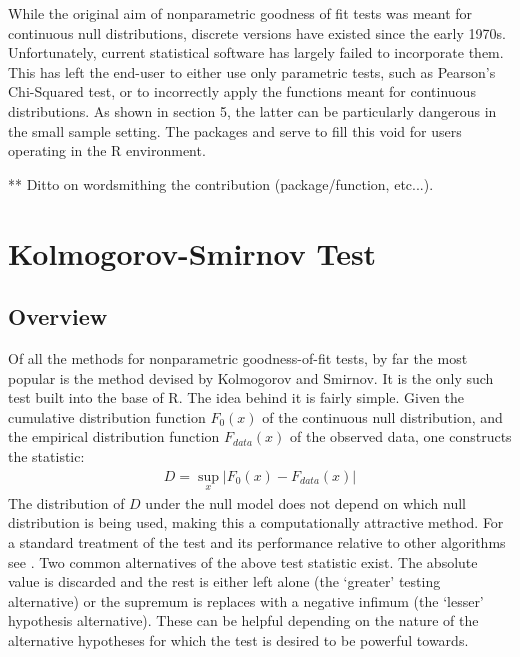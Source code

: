 While the original aim of nonparametric goodness of fit tests was meant for continuous null distributions, discrete versions
have existed since the early 1970s. Unfortunately, current statistical software has largely failed to incorporate them.
This has left the end-user to either use only parametric tests, such as Pearson's Chi-Squared test, or to incorrectly
apply the functions meant for continuous distributions. As shown in section 5, the latter can be particularly dangerous
in the small sample setting. The packages  and  serve to fill this void for users
operating in the R environment. 

** Ditto on wordsmithing the contribution (package/function, etc...).

\section{Kolmogorov-Smirnov Test}


\subsection{Overview}

Of all the methods for nonparametric goodness-of-fit tests, by far the most popular is the method devised by Kolmogorov and Smirnov.
It is the only such test built into the base of R. The idea behind it is fairly simple. Given the cumulative distribution
function $F_0(x)$ of the continuous null distribution, and the empirical distribution function $F_{data}(x)$ of the observed data, 
one constructs the statistic:
\begin{align}
D = \sup_x \left| F_0(x)- F_{data}(x) \right|
\end{align}
The distribution of $D$ under the null model does not depend on which null distribution is being used, making this a computationally
attractive method. For a standard treatment of the test and its performance relative to other algorithms see \cite{slakter65}. Two common
alternatives of the above test statistic exist. The absolute value is discarded and the rest is either left alone (the `greater' testing 
alternative) or the supremum is replaces with a negative infimum (the `lesser' hypothesis alternative). These can be helpful depending 
on the nature of the alternative hypotheses for which the test is desired to be powerful towards.

